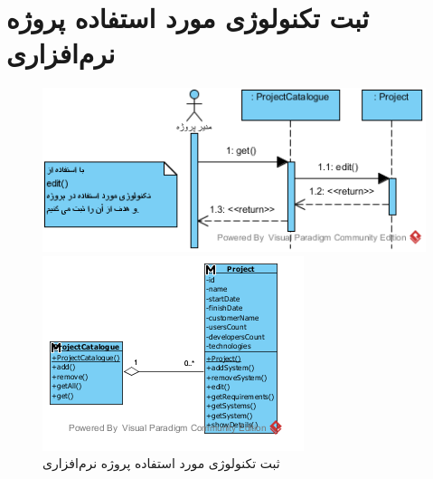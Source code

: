 \section{ثبت تکنولوژی مورد استفاده پروژه نرم‌افزاری}
\begin{figure}[H]
	\centering
	\includegraphics[scale=1]{img/sequence-analysis/AddTechnology}
	
	
	\includegraphics[scale=1]{img/sequence-analysis/AddTechnologyC}
	\caption{ثبت تکنولوژی مورد استفاده پروژه نرم‌افزاری}
\end{figure}

